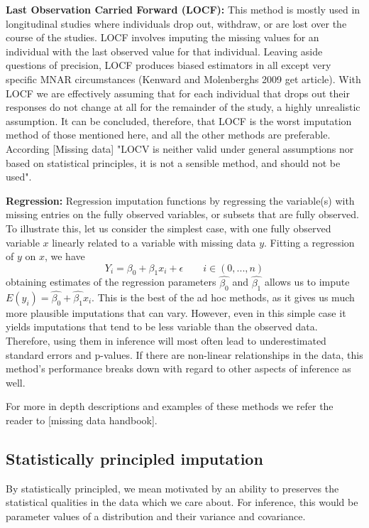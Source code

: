 \documentclass{article}
\begin{document}
	
	\textbf{Last Observation Carried Forward (LOCF):}
	This method is mostly used in longitudinal studies where individuals drop out, withdraw, or are lost over the course of the studies. LOCF involves imputing the missing values for an individual with the last observed value for that individual. Leaving aside questions of precision, LOCF produces biased estimators in all except very specific MNAR circumstances (Kenward and Molenberghs 2009 get article). With LOCF we are effectively assuming that for each individual that drops out their responses do not change at all for the remainder of the study, a highly unrealistic assumption. It can be concluded, therefore, that LOCF is the worst imputation method of those mentioned here, and all the other methods are preferable. According [Missing data] "LOCV is neither valid under general assumptions nor based on statistical principles, it is not a sensible method, and should not be used".
	
	\textbf{Regression:}
	Regression imputation functions by regressing the variable(s) with missing entries on the fully observed variables, or subsets that are fully observed. To illustrate this, let us consider the simplest case, with one fully observed variable $x$ linearly related to a variable with missing data $y$. Fitting a regression of $y$ on $x$, we have$$Y_{i} = \beta_{0} + \beta_{1}x_{i} + \epsilon \qquad i\in(0,...,n)$$ obtaining estimates of the regression parameters $\hat{\beta_{0}}$ and $\hat{\beta_{1}}$ allows us to impute $E(y_{i}) = \hat{\beta_{0}} + \hat{\beta_{1}}x_{i}$. This is the best of the ad hoc methods, as it gives us much more plausible imputations that can vary. However, even in this simple case it yields imputations that tend to be less variable than the observed data. Therefore, using them in inference will most often lead to underestimated standard errors and p-values. If there are non-linear relationships in the data, this method's performance breaks down with regard to other aspects of inference as well.
	
	For more in depth descriptions and examples of these methods we refer the reader to [missing data handbook].
	
	\subsection{Statistically principled imputation}
	By statistically principled, we mean motivated by an ability to preserves the statistical qualities in the data which we care about. For inference, this would be parameter values of a distribution and their variance and covariance.
	
\end{document}
